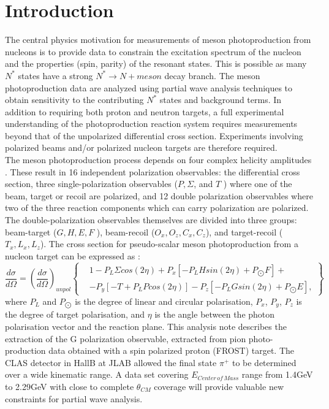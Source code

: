 \section{Introduction}
The central physics motivation for measurements of meson photoproduction from nucleons is to provide data to constrain the excitation spectrum of the nucleon and the properties (spin, parity) of the resonant states.  This is possible as many $N^*$ states have a strong $N^*\rightarrow N + meson$  decay branch.  The meson photoproduction data are analyzed using partial wave analysis techniques to obtain sensitivity to the contributing $N^*$ states and background terms.
In addition to requiring both proton and neutron targets, a full experimental understanding of the photoproduction reaction system requires measurements
beyond that of the unpolarized differential cross section. Experiments involving polarized beams and/or polarized nucleon targets are therefore required. \\
The meson photoproduction process depends on four complex helicity amplitudes \cite{PhysRev.106.1337} \cite{PhysRev.106.1345}. These result in 16 independent polarization observables: the differential cross section, three single-polarization observables ($P, \Sigma$, and $T$ ) where one of the beam, target
or recoil are polarized, and 12 double polarization observables where two of the three reaction components which can carry polarization are polarized. The
double-polarization observables themselves are divided into three groups: beam-target ($G, H, E, F$ ), beam-recoil ($O_x , O_z, C_x , C_z$), and target-recoil ($T_x , L_x , L_z$).
The cross section for pseudo-scalar meson photoproduction from a nucleon target can be expressed as \cite{Bark_1974}:
\begin{equation}
\frac{d\sigma}{d\Omega} = \left(\frac{d\sigma}{d\Omega} \right)_{unpol}  \left\{ 
\begin{aligned}
    & 1 - P_L \Sigma cos(2\eta) + P_x \left[-P_L H sin(2\eta) + P_{\bigodot}F\right] + \\
& -P_y \left[ -T +P_L P cos(2\eta)\right] -P_z \left[-P_L G sin(2\eta) + P_{\bigodot}E\right],
\end{aligned}
\right\} 
\label{eqn:CGLN}
\end{equation}
where $P_L$ and $P_{\bigodot}$ is the degree of linear and circular polarisation, $P_x$, $P_y$, $P_z$ is the degree of target polarisation, and $\eta$ is the angle between the photon polarisation vector and the reaction plane.  
This analysis note describes the extraction of the G polarization observable, extracted from pion photo-production data obtained with a spin polarized proton (FROST) target. The CLAS detector in HallB at JLAB allowed the final state $\pi^+$ to be determined over a wide kinematic range. A data set covering $E_{Center\, of\, Mass}$ range from 1.4GeV to 2.29GeV with close to complete $\theta_{CM}$ coverage will provide valuable new constraints for partial wave analysis.
